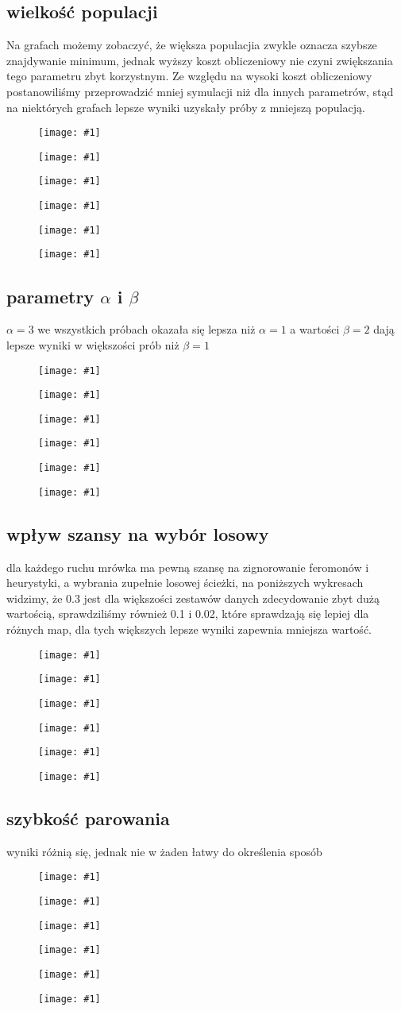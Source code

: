 \documentclass{article}
\newcommand{\inputgraph}[1]{

  \begin{figure}[H]
		\texttt{[image: \#1]}
  \end{figure}}
\begin{document}
\subsection{wielkość populacji}
Na grafach możemy zobaczyć, że większa populacjia zwykle oznacza szybsze
znajdywanie minimum, jednak wyższy koszt obliczeniowy nie czyni zwiększania tego
parametru zbyt korzystnym. Ze względu na wysoki koszt obliczeniowy
postanowiliśmy przeprowadzić mniej symulacji niż dla innych parametrów, stąd na
niektórych grafach lepsze wyniki uzyskały próby z mniejszą populacją.
\inputgraph{1l.png}
\inputgraph{2l.png}
\inputgraph{3l.png}
\inputgraph{4l.png}
\inputgraph{5l.png}
\inputgraph{6l.png}

\subsection{parametry $\alpha$ i $\beta$}
$\alpha=3$ we wszystkich próbach okazała się lepsza niż $\alpha=1$ a wartości $\beta=2$ dają
lepsze wyniki w większości prób niż $\beta=1$
\inputgraph{1w.png}
\inputgraph{2w.png}
\inputgraph{3w.png}
\inputgraph{4w.png}
\inputgraph{5w.png}
\inputgraph{6w.png}
\subsection{wpływ szansy na wybór losowy}
dla każdego ruchu mrówka ma pewną szansę na zignorowanie feromonów i
heurystyki, a wybrania zupełnie losowej ścieżki, na poniższych wykresach
widzimy, że 0.3 jest dla większości zestawów danych zdecydowanie zbyt dużą
wartością, sprawdziliśmy również 0.1 i 0.02, które sprawdzają się lepiej dla
różnych map, dla tych większych lepsze wyniki zapewnia mniejsza wartość.
\inputgraph{1s.png}
\inputgraph{2s.png}
\inputgraph{3s.png}
\inputgraph{4s.png}
\inputgraph{5s.png}
\inputgraph{6s.png}
\subsection{szybkość parowania}
wyniki różnią się, jednak nie w żaden łatwy do określenia sposób
\inputgraph{1p.png}
\inputgraph{2p.png}
\inputgraph{3p.png}
\inputgraph{4p.png}
\inputgraph{5p.png}
\inputgraph{6p.png}
\end{document}
